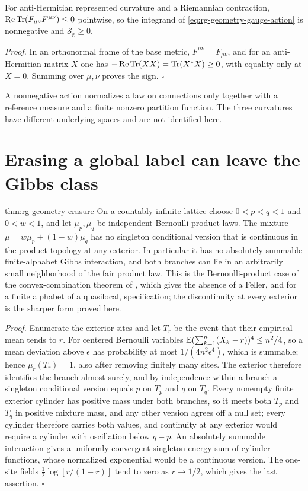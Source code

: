 For anti-Hermitian represented curvature and a Riemannian contraction,
$\operatorname{Re}\operatorname{Tr}(F_{\mu\nu}F^{\mu\nu})\leq0$ pointwise, so the integrand
of \cref{eq:rg-geometry-gauge-action} is nonnegative and
$\mathscr S_{\mathrm g}\geq0$. 

\noindent\emph{Proof.}
In an orthonormal frame of the base metric, $F^{\mu\nu}=F_{\mu\nu}$, and for
an anti-Hermitian matrix $X$ one has
$-\operatorname{Re}\operatorname{Tr}(XX)=\operatorname{Tr}(X^*X)\geq0$, with equality only at $X=0$.
Summing over $\mu,\nu$ proves the sign. $\square$

A nonnegative action normalizes a law on connections only together with a
reference measure and a finite nonzero partition function. The three
curvatures have different underlying spaces and are not identified here.

\section{Erasing a global label can leave the Gibbs class}
\label{sec:rg-geometry-erasure}

{thm:rg-geometry-erasure}
On a countably infinite lattice choose $0<p<q<1$ and $0<w<1$, and let
$\mu_p,\mu_q$ be independent Bernoulli product laws. The mixture
$\mu=w\mu_p+(1-w)\mu_q$ has no singleton conditional version that is
continuous in the product topology at any exterior. In particular it has no
absolutely summable finite-alphabet Gibbs interaction, and both branches can
lie in an arbitrarily small neighborhood of the fair product law. This is
the Bernoulli-product case of the convex-combination theorem of
\citet[Sec.~4.5.1, Prop.~4.12 and Cor.~4.13]{VanEnterFernandezSokal1993},
which gives the absence of a Feller, and for a finite alphabet of a
quasilocal, specification; the discontinuity at every exterior is the
sharper form proved here. 

\noindent\emph{Proof.}
Enumerate the exterior sites and let $T_r$ be the event that their empirical
mean tends to $r$. For centered Bernoulli variables
$\mathbb E(\sum_{k=1}^n(X_k-r))^4\leq n^2/4$, so a mean deviation above $\epsilon$
has probability at most $1/(4n^2\epsilon^4)$, which is summable; hence
$\mu_r(T_r)=1$, also after removing finitely many sites. The exterior
therefore identifies the branch almost surely, and by independence within a
branch a singleton conditional version equals $p$ on $T_p$ and $q$ on $T_q$.
Every nonempty finite exterior cylinder has positive mass under both
branches, so it meets both $T_p$ and $T_q$ in positive mixture mass, and any
other version agrees off a null set; every cylinder therefore carries both
values, and continuity at any exterior would require a cylinder with
oscillation below $q-p$. An absolutely summable interaction gives a uniformly
convergent singleton energy sum of cylinder functions, whose normalized
exponential would be a continuous version. The one-site fields
$\tfrac12\log[r/(1-r)]$ tend to zero as $r\to1/2$, which gives the last
assertion. $\square$

